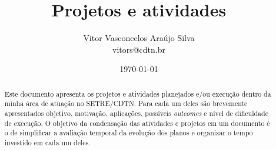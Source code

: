 \documentclass[12pt]{report} %
\begin{document}
\title{Projetos e atividades}
\author{Vitor Vasconcelos Araújo Silva\\ vitors@cdtn.br}
\date{\today}

\maketitle %


\tableofcontents %
\pagebreak %
\pagebreak %

\begin{abstract}
Este documento apresenta os projetos e atividades planejados e/ou execução 
dentro da minha área de atuação no SETRE/CDTN. Para cada um deles são 
brevemente apresentados objetivo, motivação, aplicações, possíveis \textit{outcomes} e nível de dificuldade de execução. O objetivo da 
condensação das atividades e projetos em um documento é o de simplificar 
a avaliação temporal da evolução dos planos e organizar o tempo investido 
em cada um deles.
\end{abstract}

\begin{versionhistory}
\end{versionhistory}




\end{document}
